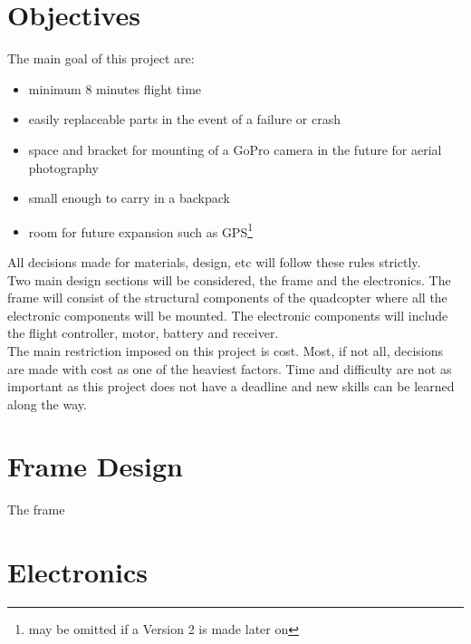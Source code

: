\documentclass[12pt]{article}
\begin{document}
\section{Objectives}

The main goal of this project are:
\renewcommand{\labelitemi}{\textperiodcentered}
\begin{itemize}
\item minimum 8 minutes flight time
\item easily replaceable parts in the event of a failure or crash
\item space and bracket for mounting of a GoPro camera in the future for aerial photography
\item small enough to carry in a backpack
\item room for future expansion such as GPS\footnote[1]{may be omitted if a Version 2 is made later on}
\end{itemize}
All decisions made for materials, design, etc will follow these rules strictly.
\\

Two main design sections will be considered, the frame and the electronics. The frame will consist of the structural components of the quadcopter where all the electronic components will be mounted. The electronic components will include the flight controller, motor, battery and receiver. 
\\

The main restriction imposed on this project is cost. Most, if not all, decisions are made with cost as one of the heaviest factors. Time and difficulty are not as important as this project does not have a deadline and new skills can be learned along the way.

\section{Frame Design}

The frame 
\section{Electronics}
\end{document}
